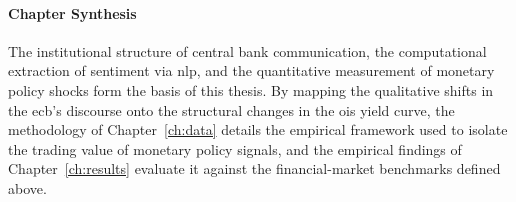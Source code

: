 \paragraph{Chapter Synthesis}
The institutional structure of central bank communication, the computational extraction of sentiment via \gls{nlp}, and the quantitative measurement of monetary policy shocks form the basis of this thesis. By mapping the qualitative shifts in the \gls{ecb}'s discourse onto the structural changes in the \gls{ois} yield curve, the methodology of Chapter~\ref{ch:data} details the empirical framework used to isolate the trading value of monetary policy signals, and the empirical findings of Chapter~\ref{ch:results} evaluate it against the financial-market benchmarks defined above.